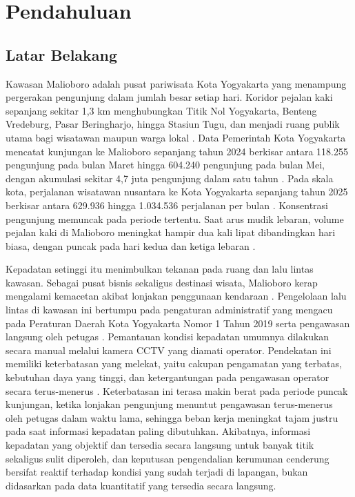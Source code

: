 \chapter{Pendahuluan}

\section{Latar Belakang}

Kawasan Malioboro adalah pusat pariwisata Kota Yogyakarta yang menampung pergerakan 
pengunjung dalam jumlah besar setiap hari. Koridor pejalan kaki sepanjang sekitar 1,3 km 
menghubungkan Titik Nol Yogyakarta, Benteng Vredeburg, Pasar Beringharjo, hingga Stasiun 
Tugu, dan menjadi ruang publik utama bagi wisatawan maupun warga lokal 
\cite{rahmah2025tingkat}. Data Pemerintah Kota Yogyakarta mencatat kunjungan ke Malioboro 
sepanjang tahun 2024 berkisar antara 118.255 pengunjung pada bulan Maret hingga 604.240 
pengunjung pada bulan Mei, dengan akumulasi sekitar 4,7 juta pengunjung dalam satu tahun 
\cite{pemkotjogja2024pengunjung}. Pada skala kota, perjalanan wisatawan nusantara ke Kota 
Yogyakarta sepanjang tahun 2025 berkisar antara 629.936 hingga 1.034.536 perjalanan per 
bulan \cite{bpsdiy2025wisnus}. Konsentrasi pengunjung memuncak pada periode tertentu. 
Saat arus mudik lebaran, volume pejalan kaki di Malioboro meningkat hampir dua kali lipat 
dibandingkan hari biasa, dengan puncak pada hari kedua dan ketiga lebaran 
\cite{lagalo2024dinamika}.

Kepadatan setinggi itu menimbulkan tekanan pada ruang dan lalu lintas kawasan. Sebagai 
pusat bisnis sekaligus destinasi wisata, Malioboro kerap mengalami kemacetan akibat 
lonjakan penggunaan kendaraan \cite{saputra2021pengelolaan}. Pengelolaan lalu lintas di 
kawasan ini bertumpu pada pengaturan administratif yang mengacu pada Peraturan Daerah 
Kota Yogyakarta Nomor 1 Tahun 2019 serta pengawasan langsung oleh petugas 
\cite{saputra2021pengelolaan}. Pemantauan kondisi kepadatan umumnya dilakukan secara 
manual melalui kamera CCTV yang diamati operator. Pendekatan ini memiliki 
keterbatasan yang melekat, yaitu cakupan pengamatan yang terbatas, kebutuhan daya yang 
tinggi, dan ketergantungan pada pengawasan operator secara terus-menerus 
\cite{khan2020crowd}. Keterbatasan ini terasa makin berat pada periode puncak kunjungan, 
ketika lonjakan pengunjung menuntut pengawasan terus-menerus oleh petugas dalam waktu lama, 
sehingga beban kerja meningkat tajam justru pada saat informasi kepadatan paling dibutuhkan. 
Akibatnya, informasi kepadatan yang objektif dan tersedia secara 
langsung untuk banyak titik sekaligus sulit diperoleh, dan keputusan pengendalian kerumunan 
cenderung bersifat reaktif terhadap kondisi yang sudah terjadi di lapangan, bukan didasarkan 
pada data kuantitatif yang tersedia secara langsung.

